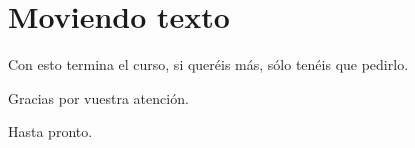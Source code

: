 \chapter{Moviendo texto}

\begin{center}
Con esto termina el curso, si queréis más, sólo tenéis que pedirlo.

Gracias por vuestra atención.
\end{center}

\hfill Hasta pronto.
